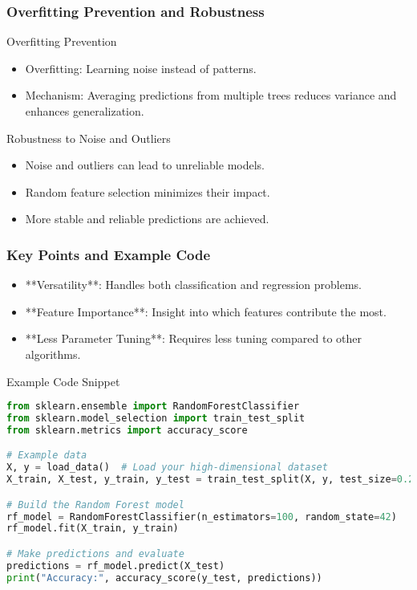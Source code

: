 \documentclass[aspectratio=169]{beamer}
\begin{document}
\begin{frame}[fragile]
  \frametitle{Overfitting Prevention and Robustness}
  \begin{block}{Overfitting Prevention}
    \begin{itemize}
      \item Overfitting: Learning noise instead of patterns.
      \item Mechanism: Averaging predictions from multiple trees reduces variance and enhances generalization.
    \end{itemize}
  \end{block}
  
  \begin{block}{Robustness to Noise and Outliers}
    \begin{itemize}
      \item Noise and outliers can lead to unreliable models.
      \item Random feature selection minimizes their impact.
      \item More stable and reliable predictions are achieved.
    \end{itemize}
  \end{block}
\end{frame}

\begin{frame}[fragile]
  \frametitle{Key Points and Example Code}
  \begin{itemize}
    \item **Versatility**: Handles both classification and regression problems.
    \item **Feature Importance**: Insight into which features contribute the most.
    \item **Less Parameter Tuning**: Requires less tuning compared to other algorithms.
  \end{itemize}

  \begin{block}{Example Code Snippet}
  \begin{lstlisting}[language=Python]
from sklearn.ensemble import RandomForestClassifier
from sklearn.model_selection import train_test_split
from sklearn.metrics import accuracy_score

# Example data
X, y = load_data()  # Load your high-dimensional dataset
X_train, X_test, y_train, y_test = train_test_split(X, y, test_size=0.2, random_state=42)

# Build the Random Forest model
rf_model = RandomForestClassifier(n_estimators=100, random_state=42)
rf_model.fit(X_train, y_train)

# Make predictions and evaluate
predictions = rf_model.predict(X_test)
print("Accuracy:", accuracy_score(y_test, predictions))
  \end{lstlisting}
  \end{block}
\end{frame}
\end{document}
